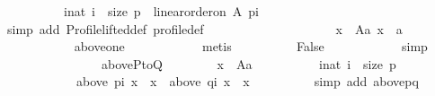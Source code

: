 \begin{isabellebody}
\isanewline
\ \ \ \ \ \ \ \ \ \ {\isachardoublequoteopen}{\isasymforall}i{\isacharcolon}{\kern0pt}{\isacharcolon}{\kern0pt}nat{\isachardot}{\kern0pt}\ i\ {\isacharless}{\kern0pt}\ size\ p\ {\isasymlongrightarrow}\ linear{\isacharunderscore}{\kern0pt}order{\isacharunderscore}{\kern0pt}on\ A\ {\isacharparenleft}{\kern0pt}p{\isacharbang}{\kern0pt}i{\isacharparenright}{\kern0pt}{\isachardoublequoteclose}\isanewline
\ \ \ \ \ \ \ \ \ \ \isamarkupfalse%
\ {\isacharparenleft}{\kern0pt}simp\ add{\isacharcolon}{\kern0pt}\ Profile{\isachardot}{\kern0pt}lifted{\isacharunderscore}{\kern0pt}def\ profile{\isacharunderscore}{\kern0pt}def{\isacharparenright}{\kern0pt}\isanewline
\ \ \ \ \ \ \ \ \isamarkupfalse%
\ \isamarkupfalse%
\isanewline
\ \ \ \ \ \ \ \ \ \ {\isachardoublequoteopen}{\isasymexists}x\ {\isasymin}\ A{\isacharminus}{\kern0pt}{\isacharbraceleft}{\kern0pt}a{\isacharbraceright}{\kern0pt}{\isachardot}{\kern0pt}\ x\ {\isacharequal}{\kern0pt}\ a{\isachardoublequoteclose}\isanewline
\ \ \ \ \ \ \ \ \ \ \isamarkupfalse%
\ above{\isacharunderscore}{\kern0pt}one{}\isanewline
\ \ \ \ \ \ \ \ \ \ \isamarkupfalse%
\ metis\isanewline
\ \ \ \ \ \ \ \ \isamarkupfalse%
\ {\isachardoublequoteopen}False{\isachardoublequoteclose}\isanewline
\ \ \ \ \ \ \ \ \ \ \isamarkupfalse%
\ simp\isanewline
\ \ \ \ \ \ \isamarkupfalse%
\isanewline
\ \ \ \ \ \ \isamarkupfalse%
\ \isamarkupfalse%
\ above{\isacharunderscore}{\kern0pt}PtoQ{\isacharcolon}{\kern0pt}\isanewline
\ \ \ \ \ \ \ \ {\isachardoublequoteopen}{\isasymforall}x\ {\isasymin}\ A{\isacharminus}{\kern0pt}{\isacharbraceleft}{\kern0pt}a{\isacharbraceright}{\kern0pt}{\isachardot}{\kern0pt}\isanewline
\ \ \ \ \ \ \ \ \ \ {\isasymforall}i{\isacharcolon}{\kern0pt}{\isacharcolon}{\kern0pt}nat{\isachardot}{\kern0pt}\ i\ {\isacharless}{\kern0pt}\ size\ p\ {\isasymlongrightarrow}\isanewline
\ \ \ \ \ \ \ \ \ \ \ \ {\isacharparenleft}{\kern0pt}above\ {\isacharparenleft}{\kern0pt}p{\isacharbang}{\kern0pt}i{\isacharparenright}{\kern0pt}\ x\ {\isacharequal}{\kern0pt}\ {\isacharbraceleft}{\kern0pt}x{\isacharbraceright}{\kern0pt}\ {\isasymlongrightarrow}\ above\ {\isacharparenleft}{\kern0pt}q{\isacharbang}{\kern0pt}i{\isacharparenright}{\kern0pt}\ x\ {\isacharequal}{\kern0pt}\ {\isacharbraceleft}{\kern0pt}x{\isacharbraceright}{\kern0pt}{\isacharparenright}{\kern0pt}{\isachardoublequoteclose}\isanewline
\ \ \ \ \ \ \ \ \isamarkupfalse%
\ {\isacharparenleft}{\kern0pt}simp\ add{\isacharcolon}{\kern0pt}\ above{\isacharunderscore}{\kern0pt}pq{\isacharparenright}{\kern0pt}\isanewline

\end{isabellebody}
